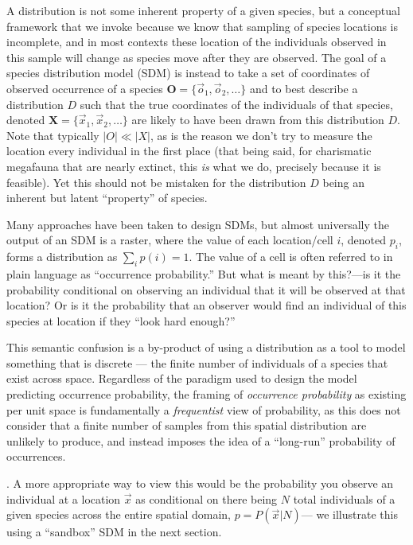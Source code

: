 \documentclass[11pt]{article}
\begin{document}
A distribution is not some inherent property of a given species, but a
conceptual framework that we invoke because we know that sampling of
species locations is incomplete, and in most contexts these location of
the individuals observed in this sample will change as species move
after they are observed. The goal of a species distribution model (SDM)
is instead to take a set of coordinates of observed occurrence of a
species \(\mathbf{O} = \{\vec{o}_1, \vec{o}_2, \dots\}\) and to best
describe a distribution \(D\) such that the true coordinates of the
individuals of that species, denoted
\(\mathbf{X} = \{\vec{x}_1, \vec{x}_2, \dots\}\) are likely to have been
drawn from this distribution \(D\). Note that typically \(|O| \ll |X|\),
as is the reason we don't try to measure the location every individual
in the first place (that being said, for charismatic megafauna that are
nearly extinct, this \emph{is} what we do, precisely because it is
feasible). Yet this should not be mistaken for the distribution \(D\)
being an inherent but latent ``property'' of species.

Many approaches have been taken to design SDMs, but almost universally
the output of an SDM is a raster, where the value of each location/cell
\(i\), denoted \(p_i\), forms a distribution as \(\sum_{i} p(i) = 1\).
The value of a cell is often referred to in plain language as
``occurrence probability.'' But what is meant by this?---is it the
probability conditional on observing an individual that it will be
observed at that location? Or is it the probability that an observer
would find an individual of this species at location if they ``look hard
enough?''

This semantic confusion is a by-product of using a distribution as a
tool to model something that is discrete --- the finite number of
individuals of a species that exist across space. Regardless of the
paradigm used to design the model predicting occurrence probability, the
framing of \emph{occurrence probability} as existing per unit space is
fundamentally a \emph{frequentist} view of probability, as this does not
consider that a finite number of samples from this spatial distribution
are unlikely to produce, and instead imposes the idea of a ``long-run''
probability of occurrences.

. A more appropriate way to view this would be the probability you
observe an individual at a location \(\vec{x}\) as conditional on there
being \(N\) total individuals of a given species across the entire
spatial domain, \(p = P(\vec{x} | N)\)--- we illustrate this using a
``sandbox'' SDM in the next section.
\end{document}
